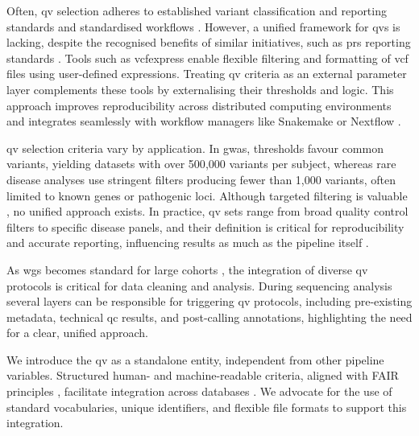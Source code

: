 Often, \ac{qv} selection adheres to established variant classification and reporting standards \cite{richards2015standards, li2017standards, li2017intervar, riggs2020technical, tavtigian2020fitting} and standardised workflows \cite{pedersen2021effective, anderson2010data, uffelmann2021genome}. 
However, a unified framework for \ac{qv}s is lacking, despite the recognised benefits of similar initiatives, such as \ac{prs} reporting standards \cite{wand2021improving, lambert2021polygenic}.
Tools such as vcfexpress \cite{pedersen_vcfexpress_2025} enable flexible filtering and formatting of \ac{vcf} files using user-defined expressions. Treating \ac{qv} criteria as an external parameter layer complements these tools by externalising their thresholds and logic. This approach improves reproducibility across distributed computing environments \cite{bal_programming_1989} and integrates seamlessly with workflow managers like Snakemake \cite{molder_sustainable_2021} or Nextflow \cite{di_tommaso_nextflow_2017}.

\ac{qv} selection criteria vary by application. In \ac{gwas}, thresholds favour common variants, yielding datasets with over 500{,}000 variants per subject, whereas rare disease analyses use stringent filters producing fewer than 1{,}000 variants, often limited to known genes or pathogenic loci. Although targeted filtering is valuable \cite{povysil2019rare, cirulli2015exome}, no unified approach exists. In practice, \ac{qv} sets range from broad quality control filters to specific disease panels, and their definition is critical for reproducibility and accurate reporting, influencing results as much as the pipeline itself \cite{olson2023variant}.

As \ac{wgs} becomes standard for large cohorts \cite{lee2018gene, jansen2019genome}, the integration of diverse \ac{qv} protocols is critical for data cleaning and analysis. 
During sequencing analysis several layers can be responsible for triggering \ac{qv} protocols, including
pre-existing metadata, technical \ac{qc} results, and post-calling annotations,
highlighting the need for a clear, unified approach. 

We introduce the \ac{qv} as a standalone entity, independent from other pipeline variables. Structured human- and machine-readable criteria, aligned with FAIR principles \cite{wilkinson2016fair}, facilitate integration across databases \cite{van2023bridging, toure2023fairification}. We advocate for the use of standard vocabularies, unique identifiers, and flexible file formats to support this integration.

